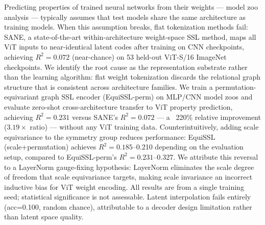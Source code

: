 
Predicting properties of trained neural networks from their weights --- model zoo analysis --- typically assumes that test models share the same architecture as training models. When this assumption breaks, flat tokenization methods fail: SANE, a state-of-the-art within-architecture weight-space SSL method, maps all ViT inputs to near-identical latent codes after training on CNN checkpoints, achieving $R^{2}=0.072$ (near-chance) on 53 held-out ViT-S/16 ImageNet checkpoints. We identify the root cause as the representation substrate rather than the learning algorithm: flat weight tokenization discards the relational graph structure that is consistent across architecture families. We train a permutation-equivariant graph SSL encoder (EquiSSL-perm) on MLP/CNN model zoos and evaluate zero-shot cross-architecture transfer to ViT property prediction, achieving $R^{2}=0.231$ versus SANE's $R^{2}=0.072$ --- a ~220\% relative improvement (3.$19\times$ ratio) --- without any ViT training data. Counterintuitively, adding scale equivariance to the symmetry group reduces performance: EquiSSL (scale+permutation) achieves $R^{2}=0.185$--0.210 depending on the evaluation setup, compared to EquiSSL-perm's $R^{2}=0.231$--0.327. We attribute this reversal to a LayerNorm gauge-fixing hypothesis: LayerNorm eliminates the scale degree of freedom that scale equivariance targets, making scale invariance an incorrect inductive bias for ViT weight encoding. All results are from a single training seed; statistical significance is not assessable. Latent interpolation fails entirely (acc=0.100, random chance), attributable to a decoder design limitation rather than latent space quality.


